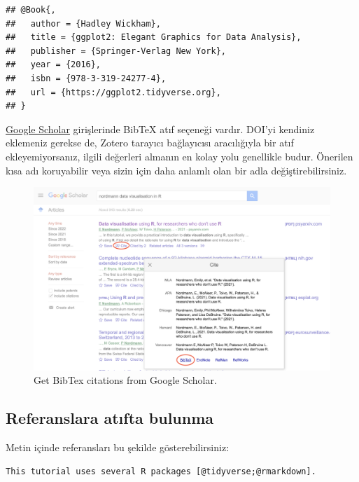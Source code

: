 \documentclass[
  oneside]{book}
\begin{document}
\begin{verbatim}
## @Book{,
##   author = {Hadley Wickham},
##   title = {ggplot2: Elegant Graphics for Data Analysis},
##   publisher = {Springer-Verlag New York},
##   year = {2016},
##   isbn = {978-3-319-24277-4},
##   url = {https://ggplot2.tidyverse.org},
## }
\end{verbatim}

\href{https://scholar.google.com/}{Google Scholar} girişlerinde BibTeX atıf seçeneği vardır. DOI'yi kendiniz eklemeniz gerekse de, Zotero tarayıcı bağlayıcısı aracılığıyla bir atıf ekleyemiyorsanız, ilgili değerleri almanın en kolay yolu genellikle budur. Önerilen kısa adı koruyabilir veya sizin için daha anlamlı olan bir adla değiştirebilirsiniz.

\begin{figure}

{\centering \includegraphics[width=1\linewidth]{images/google-scholar} 

}

\caption{Get BibTex citations from Google Scholar.}\label{fig:google-scholar}
\end{figure}

\hypertarget{referanslara-atux131fta-bulunma}{%
\subsection{Referanslara atıfta bulunma}\label{referanslara-atux131fta-bulunma}}

Metin içinde referansları bu şekilde gösterebilirsiniz:

\begin{verbatim}
This tutorial uses several R packages [@tidyverse;@rmarkdown].
\end{verbatim}
\end{document}

